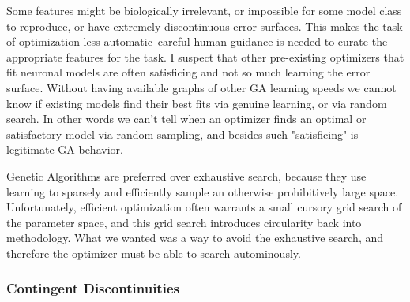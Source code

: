 Some features might be biologically irrelevant, or impossible for some model class to reproduce, or have extremely discontinuous error surfaces.
%
This makes the task of optimization less automatic--careful human guidance is needed to curate the appropriate features for the task. 
I suspect that other pre-existing optimizers that fit neuronal models are often satisficing and not so much learning the error surface. Without having available graphs of other GA learning speeds we cannot know if existing models find their best fits via genuine learning, or via random search. In other words we can't tell when an optimizer finds an optimal or satisfactory model via random sampling, and besides such "satisficing" is legitimate GA behavior.

Genetic Algorithms are preferred over exhaustive search, because they use learning to sparsely and efficiently sample an otherwise prohibitively large space. Unfortunately, efficient optimization often warrants a small cursory grid search of the parameter space, and this grid search introduces circularity back into methodology. What we wanted was a way to avoid the exhaustive search, and therefore the optimizer must be able to search autominously.
\subsubsection{Contingent Discontinuities}




